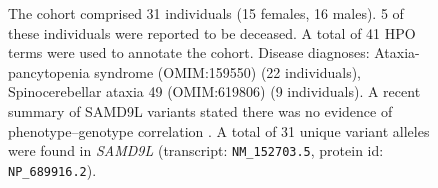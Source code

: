 \begin{figure}[htbp]
        \vspace{2em}
        
        \caption{ The cohort comprised 31 individuals (15 females, 16 males). 5 of these individuals were reported to be deceased. A total of 41 HPO terms were used to annotate the cohort. Disease diagnoses: Ataxia-pancytopenia syndrome (OMIM:159550) (22 individuals), Spinocerebellar ataxia 49 (OMIM:619806) (9 individuals). A recent summary of SAMD9L variants stated there was no evidence of phenotype–genotype correlation \cite{PMID_38594844}.
         A total of 31 unique variant alleles were found in \textit{SAMD9L} (transcript: \texttt{NM\_152703.5}, protein id: \texttt{NP\_689916.2}).}
        \end{figure}
        